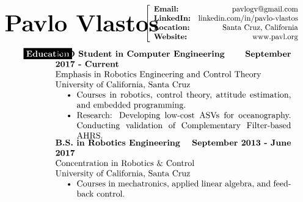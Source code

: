 \documentclass[paper=a4,fontsize=10pt]{article} %
\def \nameColWidth {0.5\textwidth}		%
\def \mainColWidth {0.8\textwidth}		%
\def \leftColWidth {0.05\textwidth}		%
\begin{document}
\begin{align*}
	&
	\parbox{\nameColWidth}{%
		\text{\fontsize{30}{36}\selectfont \textbf{Pavlo Vlastos}}
	}%
	&
	\left[\begin{array}{lr}
		\textbf{Email:} & \text{pavlogv@gmail.com}\\
		\textbf{LinkedIn:} & \text{linkedin.com/in/pavlo-vlastos}\\
		\textbf{Location:} & \text{Santa Cruz, California}\\
		\textbf{Website:} & \text{www.pavl.org}
	\end{array}
	\right.
	&
\end{align*}
%
\begin{align*}
	&
	\begin{array}[t]{l}
	\parbox[t]{\leftColWidth}{%
		\colorbox{black}{\color{white}{\textbf{Education}}}
	}%
	\end{array}
	&
	\begin{array}[t]{l}
		\parbox[t]{\mainColWidth}{%
			\textbf{PhD Student in Computer Engineering} \hfill \textbf{September 2017 - Current} \\
			Emphasis in Robotics Engineering and Control Theory\\
			University of California, Santa Cruz
			\begin{itemize}[noitemsep,topsep=0pt]
			\item Courses in robotics, control theory, attitude estimation, and embedded programming.
			\item Research: Developing low-cost ASVs for oceanography. Conducting validation of Complementary Filter-based AHRS.
			\end{itemize}
		}%
		\\
		\parbox[t]{\mainColWidth}{%
			\textbf{B.S. in Robotics Engineering} \hfill \textbf{September 2013 - June 2017}\\
			Concentration in Robotics \& Control\\
			University of California, Santa Cruz
			\begin{itemize}[noitemsep,topsep=0pt]
			\item Courses in mechatronics, applied linear algebra, and feedback control.
			\end{itemize}
}
\end{array}
\end{align*}
\end{document}

